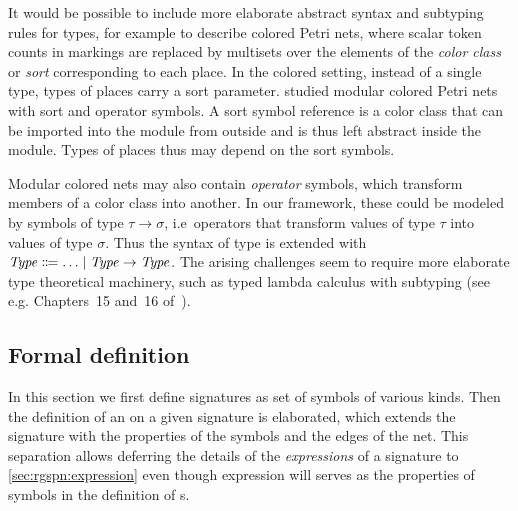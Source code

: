 \begin{remark}\label{rem:rgspn:colored}
  It would be possible to include more elaborate abstract syntax and subtyping rules for types, for example to describe colored Petri nets, where scalar token counts in markings are replaced by multisets over the elements of the \emph{color class} or \emph{sort} corresponding to each place. In the colored setting, instead of a single  type, types of places carry a sort parameter. \citet{Kindler07modular} studied modular colored Petri nets with sort and operator symbols. A sort symbol reference is a color class that can be imported into the module from outside and is thus left abstract inside the module. Types of places thus may depend on the sort symbols.

  Modular colored nets may also contain \emph{operator} symbols, which transform members of a color class into another. In our framework, these could be modeled by symbols of type \(\tau \to \sigma\), i.e~operators that transform values of type \(\tau\) into values of type \(\sigma\). Thus the syntax of type is extended with~\(\textrm{\itshape Type\/} \Coloneqq \ldots \mid \textrm{\itshape Type\/} \rightarrow \textrm{\itshape Type\/}\). The arising challenges seem to require more elaborate type theoretical machinery, such as typed lambda calculus with subtyping (see e.g. Chapters~15 and~16 of~\cite{Pierce02tapl}).
\end{remark}

\subsection{Formal definition}

In this section we first define  signatures as set of symbols of various kinds. Then the definition of an  on a given signature is elaborated, which extends the signature with the properties of the symbols and the edges of the net. This separation allows deferring the details of the \emph{expressions} of a signature to \vref{sec:rgspn:expression} even though expression will serves as the properties of symbols in the definition of s.

